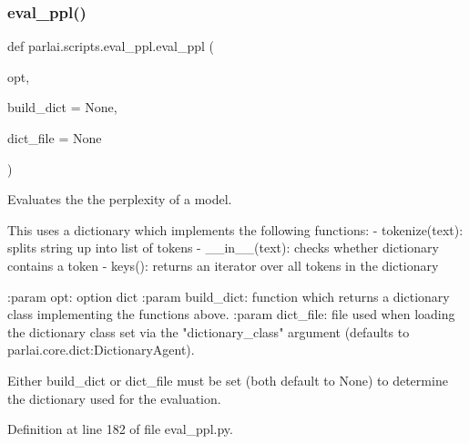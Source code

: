 \subsubsection{\texorpdfstring{eval\+\_\+ppl()}{eval\_ppl()}}
{\footnotesize\ttfamily def parlai.\+scripts.\+eval\+\_\+ppl.\+eval\+\_\+ppl (\begin{DoxyParamCaption}\item[{}]{opt,  }\item[{}]{build\+\_\+dict = {\ttfamily None},  }\item[{}]{dict\+\_\+file = {\ttfamily None} }\end{DoxyParamCaption})}

\begin{DoxyVerb}Evaluates the the perplexity of a model.

This uses a dictionary which implements the following functions:
- tokenize(text): splits string up into list of tokens
- __in__(text): checks whether dictionary contains a token
- keys(): returns an iterator over all tokens in the dictionary

:param opt: option dict
:param build_dict: function which returns a dictionary class implementing
    the functions above.
:param dict_file: file used when loading the dictionary class set via the
    "dictionary_class" argument (defaults to
    parlai.core.dict:DictionaryAgent).

Either build_dict or dict_file must be set (both default to None) to
determine the dictionary used for the evaluation.
\end{DoxyVerb}
 

Definition at line 182 of file eval\+\_\+ppl.\+py.


